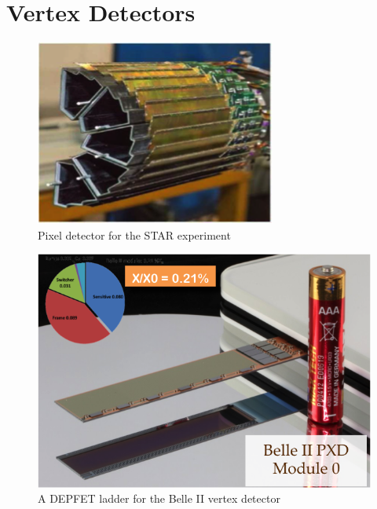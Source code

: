 \section{Vertex Detectors}

\begin{figure}
    \centering
    \includegraphics[width=.5\linewidth]{Spinoffs/STAR.png}
    \caption{Pixel detector for the STAR experiment}
    \label{fig:spinoffs:star}
\end{figure}

\begin{figure}
    \centering
    \includegraphics[width=.5\linewidth]{Spinoffs/BelleII_Depfet.png}
    \caption{A DEPFET ladder for the Belle II vertex detector}
    \label{fig:spinoffs:belleII}
\end{figure}


